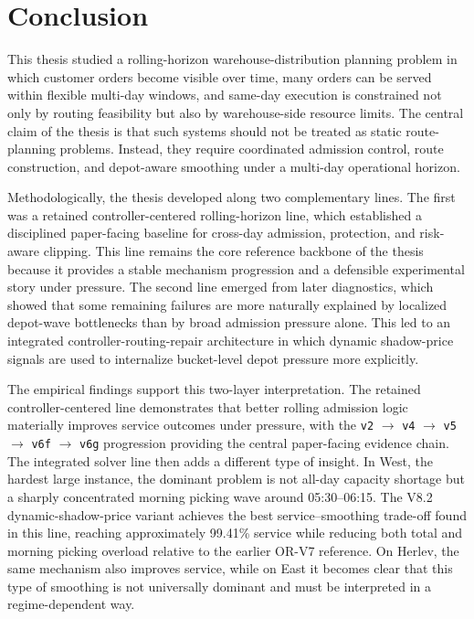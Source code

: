 \chapter{Conclusion}
\label{chap:conclusion}

This thesis studied a rolling-horizon warehouse-distribution planning problem in which customer orders become visible over time, many orders can be served within flexible multi-day windows, and same-day execution is constrained not only by routing feasibility but also by warehouse-side resource limits. The central claim of the thesis is that such systems should not be treated as static route-planning problems. Instead, they require coordinated admission control, route construction, and depot-aware smoothing under a multi-day operational horizon.

Methodologically, the thesis developed along two complementary lines. The first was a retained controller-centered rolling-horizon line, which established a disciplined paper-facing baseline for cross-day admission, protection, and risk-aware clipping. This line remains the core reference backbone of the thesis because it provides a stable mechanism progression and a defensible experimental story under pressure. The second line emerged from later diagnostics, which showed that some remaining failures are more naturally explained by localized depot-wave bottlenecks than by broad admission pressure alone. This led to an integrated controller-routing-repair architecture in which dynamic shadow-price signals are used to internalize bucket-level depot pressure more explicitly.

The empirical findings support this two-layer interpretation. The retained controller-centered line demonstrates that better rolling admission logic materially improves service outcomes under pressure, with the \texttt{v2} $\rightarrow$ \texttt{v4} $\rightarrow$ \texttt{v5} $\rightarrow$ \texttt{v6f} $\rightarrow$ \texttt{v6g} progression providing the central paper-facing evidence chain. The integrated solver line then adds a different type of insight. In West, the hardest large instance, the dominant problem is not all-day capacity shortage but a sharply concentrated morning picking wave around 05:30--06:15. The V8.2 dynamic-shadow-price variant achieves the best service--smoothing trade-off found in this line, reaching approximately 99.41\% service while reducing both total and morning picking overload relative to the earlier OR-V7 reference. On Herlev, the same mechanism also improves service, while on East it becomes clear that this type of smoothing is not universally dominant and must be interpreted in a regime-dependent way.


